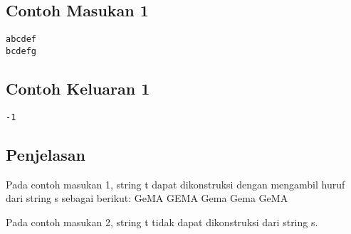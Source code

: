 \documentclass{article}
\begin{document}
\begin{multicols}{2}
\subsection*{Contoh Masukan 1}
\begin{lstlisting}
abcdef
bcdefg
\end{lstlisting}
\columnbreak
\subsection*{Contoh Keluaran 1}
\begin{lstlisting}
-1
\end{lstlisting}
\vfill
\null
\end{multicols}

\subsection*{Penjelasan}

Pada contoh masukan 1, string t dapat dikonstruksi dengan mengambil huruf dari string s sebagai berikut:
GeMA GEMA Gema Gema GeMA

Pada contoh masukan 2, string t tidak dapat dikonstruksi dari string s.
\
\end{document}
